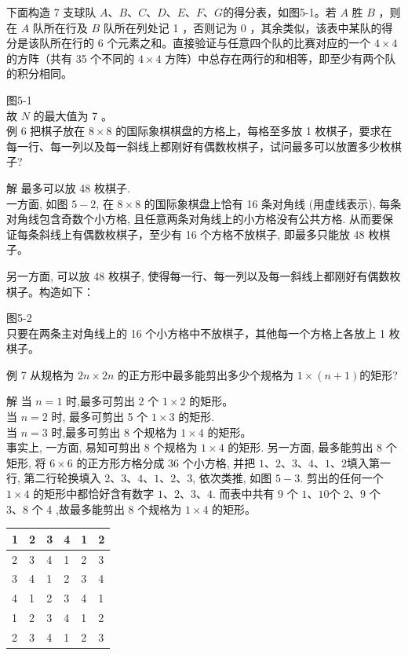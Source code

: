 \documentclass[10pt]{article}
\begin{document}
下面构造 7 支球队 $A 、 B 、 C 、 D 、 E 、 F 、 G$的得分表，如图5-1。若 $A$ 胜 $B$ ，则在 $A$ 队所在行及 $B$ 队所在列处记 1 ，否则记为 0 ，其余类似，该表中某队的得分是该队所在行的 6 个元素之和。直接验证与任意四个队的比赛对应的一个 $4 \times 4$ 的方阵（共有 35 个不同的 $4 \times 4$ 方阵）中总存在两行的和相等，即至少有两个队的积分相同。

图5-1\\
故 $N$ 的最大值为 7 。\\
例 6 把棋子放在 $8 \times 8$ 的国际象棋棋盘的方格上，每格至多放 1 枚棋子，要求在每一行、每一列以及每一斜线上都刚好有偶数枚棋子，试问最多可以放置多少枚棋子?

解 最多可以放 48 枚棋子.\\
一方面, 如图 $5-2$, 在 $8 \times 8$ 的国际象棋盘上恰有 16 条对角线 (用虚线表示), 每条对角线包含奇数个小方格, 且任意两条对角线上的小方格没有公共方格. 从而要保证每条斜线上有偶数枚棋子，至少有 16 个方格不放棋子, 即最多只能放 48 枚棋子。

另一方面, 可以放 48 枚棋子, 使得每一行、每一列以及每一斜线上都刚好有偶数枚棋子。构造如下：

图5-2\\
只要在两条主对角线上的 16 个小方格中不放棋子，其他每一个方格上各放上 1 枚棋子。

例 7 从规格为 $2 n \times 2 n$ 的正方形中最多能剪出多少个规格为 $1 \times(n+1)$的矩形?

解 当 $n=1$ 时,最多可剪出 2 个 $1 \times 2$ 的矩形。\\
当 $n=2$ 时, 最多可剪出 5 个 $1 \times 3$ 的矩形.\\
当 $n=3$ 时,最多可剪出 8 个规格为 $1 \times 4$ 的矩形。\\
事实上, 一方面, 易知可剪出 8 个规格为 $1 \times 4$ 的矩形. 另一方面, 最多能剪出 8 个矩形, 将 $6 \times 6$ 的正方形方格分成 36 个小方格, 并把 $1 、 2 、 3 、 4 、 1 、 2$填入第一行, 第二行轮换填入 $2 、 3 、 4 、 1 、 2 、 3$, 依次类推, 如图 $5-3$. 剪出的任何一个 $1 \times 4$ 的矩形中都恰好含有数字 $1 、 2 、 3 、 4$. 而表中共有 9 个 $1 、 10$个 $2 、 9$ 个 $3 、 8$ 个 4 ,故最多能剪出 8 个规格为 $1 \times 4$ 的矩形。

\begin{center}
\begin{tabular}{|l|l|l|l|l|l|}
\hline
1 & 2 & 3 & 4 & 1 & 2 \\
\hline
2 & 3 & 4 & 1 & 2 & 3 \\
\hline
3 & 4 & 1 & 2 & 3 & 4 \\
\hline
4 & 1 & 2 & 3 & 4 & 1 \\
\hline
1 & 2 & 3 & 4 & 1 & 2 \\
\hline
2 & 3 & 4 & 1 & 2 & 3 \\
\hline
\end{tabular}
\end{center}
\end{document}
